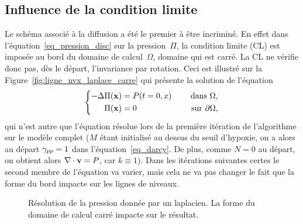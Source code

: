 \documentclass[main.tex]{subfiles}
\begin{document}
\subsection{Influence de la condition limite}
Le schéma associé à la diffusion a été le premier à être incriminé. En effet dans l'équation~\eqref{eq_pression_disc} sur la pression~$\Pi$, la condition limite (CL) est imposée au bord du domaine de calcul~$\Omega$, domaine qui est carré. La CL ne vérifie donc pas, dès le départ, l'invariance par rotation. Ceci est illustré sur la Figure~\ref{fig:ligne_nvx_laplace_carre} qui présente la solution de l'équation
\begin{equation}\label{eq:pression_iter1}
\left\{
\begin{aligned}
-\Delta \Pi(\mathbf{x}) &= P(t=0,x) & \quad \textrm{ dans }  \Omega , \\
\Pi(\mathbf{x}) &=0 & \quad \textrm{ sur  } \partial \Omega,
\end{aligned}
\right.
\end{equation}
qui n'est autre que l'équation résolue lors de la première itération de l'algorithme sur le modèle complet ($M$ étant initialisé au dessus du seuil d'hypoxie, on a alors au départ $\gamma_{pp}=1$ dans l'équation~\eqref{eq_darcy}. De plus, comme $N=0$ au départ, on obtient alors $\nabla\cdot \mathbf{v} = P$, car $k\equiv1$). Dans les itérations suivantes certes le second membre de l'équation va varier, mais cela ne va pas changer le fait que la forme du bord impacte sur les lignes de niveaux.
\begin{figure}
\centering
{}
\caption{\label{fig:ligne_nvx_laplace} Résolution de la pression donnée par un laplacien. La forme du domaine de calcul carré impacte sur le résultat.}
\end{figure}
\end{document}
